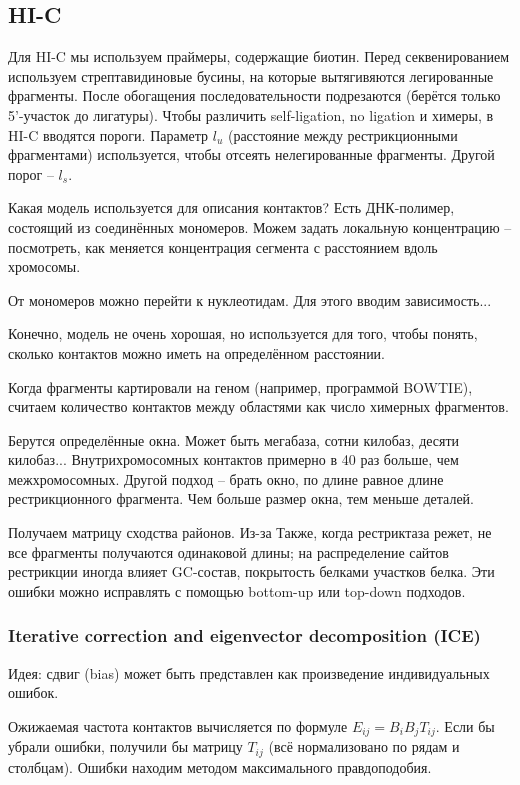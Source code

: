 \documentclass[main.tex]{subfiles}
\begin{document}
 \subsection{HI-C}
 
 Для HI-C мы используем праймеры, содержащие биотин.
 Перед секвенированием используем стрептавидиновые бусины, на которые вытягивяются легированные фрагменты.
 После обогащения последовательности подрезаются (берётся только 5'-участок до лигатуры).
 Чтобы различить  self-ligation, no ligation и химеры, в HI-C вводятся пороги.
 Параметр $l_u$ (расстояние между рестрикционными фрагментами) используется, чтобы отсеять нелегированные фрагменты.
 Другой порог -- $l_s$.
 
 Какая модель используется для описания контактов?
 Есть ДНК-полимер, состоящий из соединённых мономеров.
 Можем задать локальную концентрацию -- посмотреть, как меняется концентрация сегмента с расстоянием вдоль хромосомы.
 
 От мономеров можно перейти к нуклеотидам.
 Для этого вводим зависимость... %
 
 Конечно, модель не очень хорошая, но используется для того, чтобы понять, сколько контактов можно иметь на определённом расстоянии.
 
 Когда фрагменты картировали на геном (например, программой BOWTIE), считаем количество контактов между областями как число химерных фрагментов.
 
 Берутся определённые окна.
 Может быть мегабаза, сотни килобаз, десяти килобаз...
 Внутрихромосомных контактов примерно в 40 раз больше, чем межхромосомных.
 Другой подход -- брать окно, по длине равное длине рестрикционного фрагмента.
 Чем больше размер окна, тем меньше деталей.
 
 Получаем матрицу сходства районов.
 Из-за 
 Также, когда рестриктаза режет, не все фрагменты получаются одинаковой длины; на распределение сайтов рестрикции иногда влияет GC-состав, покрытость белками участков белка.
 Эти ошибки можно исправлять с помощью bottom-up или top-down подходов. %
 
 \subsubsection{Iterative correction and eigenvector decomposition (ICE)}
 
 Идея: сдвиг (bias) может быть представлен как произведение индивидуальных ошибок.
 
Ожижаемая частота контактов вычисляется по формуле $ E_{ij} = B_i B_j T_{ij} $.
Если бы убрали ошибки, получили бы матрицу $ T_{ij} $ (всё нормализовано по рядам и столбцам).
Ошибки находим методом максимального правдоподобия.
\end{document}
